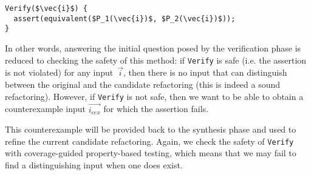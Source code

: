 \documentclass[sigconf,review,anonymous]{acmart}
\begin{document}
\begin{lstlisting}[mathescape=true,showstringspaces=false]
Verify($\vec{i}$) {
  assert(equivalent($P_1(\vec{i})$, $P_2(\vec{i})$));
}
\end{lstlisting}

In other words, answering the initial question posed by the verification
phase is reduced to checking the safety of this method: if
\texttt{Verify} is safe (i.e. the assertion is not violated) for any
input~$\vec{i}$, then there is no input that can distinguish
between the original and the candidate refactoring (this
is indeed a sound refactoring). However, if \texttt{Verify} is not safe,
then we want to be able to obtain a counterexample input
$\vec{i_{cex}}$ for which the assertion fails.

This counterexample will be provided back to the synthesis phase and
used to refine the current candidate refactoring. Again, we check the
safety of \texttt{Verify} with coverage-guided property-based testing,
which means that we may fail to find a distinguishing input when one
does exist.









\end{document}
